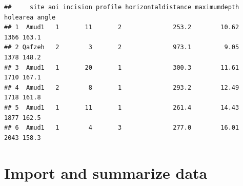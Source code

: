 \documentclass[
]{article}
\begin{document}
\begin{verbatim}
##     site aoi incision profile horizontaldistance maximumdepth holearea angle
## 1  Amud1   1       11       2              253.2        10.62     1366 163.1
## 2 Qafzeh   2        3       2              973.1         9.05     1378 148.2
## 3  Amud1   1       20       1              300.3        11.61     1710 167.1
## 4  Amud1   2        8       1              293.2        12.49     1718 161.8
## 5  Amud1   1       11       1              261.4        14.43     1877 162.5
## 6  Amud1   1        4       3              277.0        16.01     2043 158.3
\end{verbatim}

\hypertarget{import-and-summarize-data}{%
\section{Import and summarize data}\label{import-and-summarize-data}}
\end{document}
